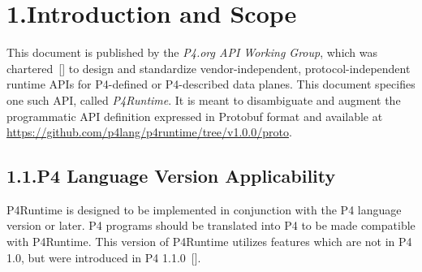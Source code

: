 \documentclass[11pt]{article}
\begin{document}
{\begin{mdtoc}
\begin{mdtocblock}



\end{mdtocblock}%
\end{mdtoc}%

\section{1.\hspace*{0.5em}Introduction and Scope}\label{sec-introduction-and-scope}%

\noindent{}This document is published by the \emph{P4.org API Working Group}, which was
chartered~[] to design and standardize vendor-independent,
protocol-independent runtime APIs for P4-defined or P4-described data
planes. This document specifies one such API, called \emph{P4Runtime}. It is meant to
disambiguate and augment the programmatic API definition expressed in Protobuf
format and available at
\href{https://github.com/p4lang/p4runtime/tree/v1.0.0/proto}{https://github.com/p4lang/p4runtime/tree/v1.0.0/proto}.%

\subsection{1.1.\hspace*{0.5em}P4 Language Version Applicability}\label{sec-p4-language-version-applicability}%

\noindent{}P4Runtime is designed to be implemented in conjunction with the P4 language
version or later. P4 programs should be translated into P4 to be made
compatible with P4Runtime. This version of P4Runtime utilizes features which are
not in P4 1.0, but were introduced in P4 1.1.0~[].%

}
\end{document}
